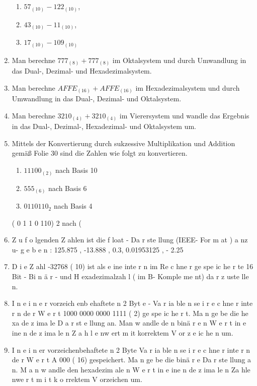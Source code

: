 \documentclass[12pt,a4paper]{scrreprt}
\begin{document}
\begin{enumerate}
\begin{enumerate}
\item $57_( 10) - 122_(10)$,
\item $43_(10) - 11_(10)$,
\item $17_(10) - 109_(10)$
\end{enumerate}

\item Man berechne $777_(8) + 777_(8)$ im Oktalsystem und durch Umwandlung in das Dual-, Dezimal- und Hexadezimalsystem.

\item Man berechne $AFFE_(16) + AFFE_(16)$ im Hexadezimalsystem und durch Umwandlung in das Dual-, Dezimal- und Oktalsystem.

\item Man berechne $3210_(4) + 3210_(4)$ im Vierersystem und wandle das Ergebnis in das Dual-, Dezimal-, Hexadezimal- und Oktalsystem um.

\item Mittels der Konvertierung durch sukzessive Multiplikation und Addition gemäß Folie 30 sind die Zahlen wie folgt zu konvertieren.

\begin{enumerate}
\item $11100_(2)$ nach Basis 10
\item $555_(6)$ nach Basis 6
\item $0110110_2$ nach Basis 4
\end{enumerate}


( 0 1 1 0 110) 2 nach (

\item Z u f o lgenden Z ahlen ist die f loat - Da r ste llung (IEEE- For m at ) a nz u-
g e b e n : 125.875 , -13.888 , 0.3, 0.01953125 , - 2.25

\item D i e Z ahl -32768 ( 10) ist als e ine inte r n im Re c hne r ge spe ic he r te 16 Bit -
Bi n ä r - und H exadezimalzah l ( im B- Komple me nt) da r z uste lle n.

\item I n e i n e r vorzeich enb ehaftete n 2 Byt e - Va r ia ble n se i r e c hne r inte r n de r
W e r t 1000 0000 0000 1111 ( 2) ge spe ic he r t. Ma n ge be die he xa de z ima le
D a r st e llung an. Man w andle de n binä r e n W e r t in e ine n de z ima le n
Z a h l e nw ert m it korrektem V or z e ic he n um.

\item I n e i n er vorzeichenbehaftete n 2 Byte Va r ia ble n se i r e c hne r inte r n de r
W e r t A 000 ( 16) gespeichert. Ma n ge be die binä r e Da r ste llung a n.
M a n w andle den hexadezim ale n W e r t in e ine n de z ima le n Za hle nwe r t
m i t k o rrektem V orzeichen um.


\end{enumerate}
\end{document}
